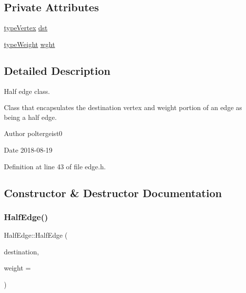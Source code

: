 \subsection*{Private Attributes}
\begin{DoxyCompactItemize}
\item 
\hyperlink{edge_8h_a5fbd20c46956d479cb10afc9855223f6}{type\+Vertex} \hyperlink{classHalfEdge_adcf841beaad30d58d0e9883c2fbc196e}{dst}
\item 
\hyperlink{edge_8h_a2e7ea3be891ac8b52f749ec73fee6dd2}{type\+Weight} \hyperlink{classHalfEdge_a936c45336ec030a89e06966d1344ac36}{wght}
\end{DoxyCompactItemize}


\subsection{Detailed Description}
Half edge class. 

Class that encapsulates the destination vertex and weight portion of an edge as being a half edge.

\begin{DoxyAuthor}{Author}
poltergeist0
\end{DoxyAuthor}
\begin{DoxyDate}{Date}
2018-\/08-\/19 
\end{DoxyDate}


Definition at line 43 of file edge.\+h.



\subsection{Constructor \& Destructor Documentation}
\mbox{\label{classHalfEdge_a110763f118d6b5936bb3fe945a3ae226}} 
\subsubsection{\texorpdfstring{Half\+Edge()}{HalfEdge()}}
{\footnotesize\ttfamily Half\+Edge\+::\+Half\+Edge (\begin{DoxyParamCaption}\item[{const \hyperlink{edge_8h_a5fbd20c46956d479cb10afc9855223f6}{type\+Vertex} \&}]{destination,  }\item[{const \hyperlink{edge_8h_a2e7ea3be891ac8b52f749ec73fee6dd2}{type\+Weight} \&}]{weight = {} }\end{DoxyParamCaption})\hspace{0.3cm}{\ttfamily [inline]}}


